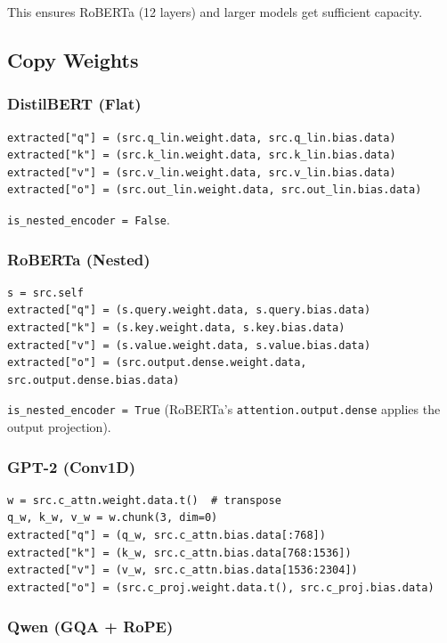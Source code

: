 This ensures RoBERTa (12 layers) and larger models get sufficient 
capacity.

\subsection{Copy Weights}

\subsubsection{DistilBERT (Flat)}

\begin{lstlisting}
extracted["q"] = (src.q_lin.weight.data, src.q_lin.bias.data)
extracted["k"] = (src.k_lin.weight.data, src.k_lin.bias.data)
extracted["v"] = (src.v_lin.weight.data, src.v_lin.bias.data)
extracted["o"] = (src.out_lin.weight.data, src.out_lin.bias.data)
\end{lstlisting}

\texttt{is\_nested\_encoder = False}.

\subsubsection{RoBERTa (Nested)}

\begin{lstlisting}
s = src.self
extracted["q"] = (s.query.weight.data, s.query.bias.data)
extracted["k"] = (s.key.weight.data, s.key.bias.data)
extracted["v"] = (s.value.weight.data, s.value.bias.data)
extracted["o"] = (src.output.dense.weight.data, src.output.dense.bias.data)
\end{lstlisting}

\texttt{is\_nested\_encoder = True} (RoBERTa's \texttt{attention.output.dense} applies the 
output projection).

\subsubsection{GPT-2 (Conv1D)}

\begin{lstlisting}
w = src.c_attn.weight.data.t()  # transpose
q_w, k_w, v_w = w.chunk(3, dim=0)
extracted["q"] = (q_w, src.c_attn.bias.data[:768])
extracted["k"] = (k_w, src.c_attn.bias.data[768:1536])
extracted["v"] = (v_w, src.c_attn.bias.data[1536:2304])
extracted["o"] = (src.c_proj.weight.data.t(), src.c_proj.bias.data)
\end{lstlisting}

\subsubsection{Qwen (GQA + RoPE)}

